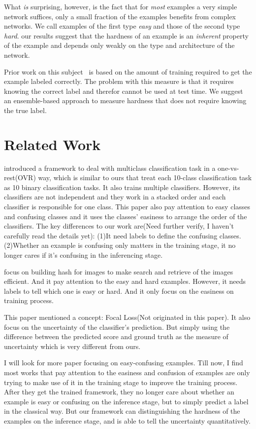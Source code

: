 \documentclass{article}
\begin{document}
What {\em is} surprising, however, is the fact that for {\em most} examples a very simple network suffices, only a small fraction of the examples benefits from complex networks. We call examples of the first type {\em easy} and those of the second type {\em hard}. our results suggest that the hardness of an example is an {\em inherent} property of the example and depends only weakly on the type and architecture of the network.

Prior work on this subject~\cite{} is based on the amount of training required to get the example labeled correctly. The problem with this measure is that it requires knowing the correct label and therefor cannot be used at test time. We suggest an ensemble-based approach to measure hardness that does not require knowing the true label.


\section{Related Work}
\cite{stacked_ovr}introduced a framework to deal with multiclass classification task in a one-vs-rest(OVR) way, which is similar to ours that treat each 10-class classification task as 10 binary classification tasks. It also trains multiple classifiers. However, its classifiers are not independent and they work in a stacked order and each classifier is responsible for one class. This paper also pay attention to easy classes and confusing classes and it uses the classes’ easiness to arrange the order of the classifiers.
The key differences to our work are(Need further verify, I haven’t carefully read the details yet): (1)It need labels to define the confusing classes. (2)Whether an example is confusing only matters in the training stage, it no longer cares if it’s confusing in the inferencing stage.

\cite{deephash} focus on building hash for images to make search and retrieve of the images efficient. And it pay attention to the easy and hard examples. However, it needs labels to tell which one is easy or hard. And it only focus on the easiness on training process.

\cite{focal_loss} This paper mentioned a concept: Focal Loss(Not originated in this paper). It also focus on the uncertainty of the classifier’s prediction. But simply using the difference between the predicted score and ground truth as the measure of uncertainty which is very different from ours.

I will look for more paper focusing on easy-confusing examples. Till now, I find most works that pay attention to the easiness and confusion of examples are only trying to make use of it in the training stage to improve the training process. After they get the trained framework, they no longer care about whether an example is easy or confusing on the inference stage, but to simply predict a label in the classical way. But our framework can distinguishing the hardness of the examples on the inference stage, and is able to tell the uncertainty quantitatively.
\end{document}
